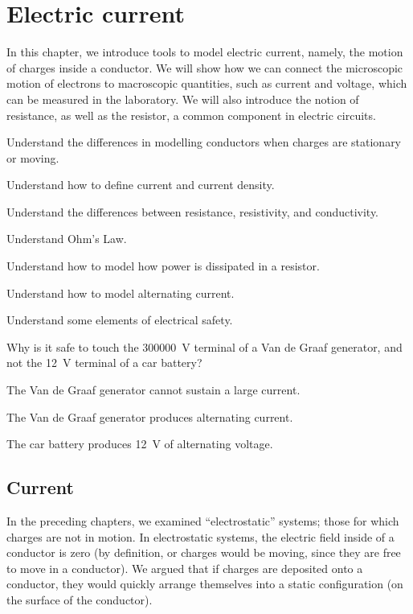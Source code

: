 \chapter{Electric current}
\label{chapter:current}
In this chapter, we introduce tools to model electric current, namely, the motion of charges inside a conductor. We will show how we can connect the microscopic motion of electrons to macroscopic quantities, such as current and voltage, which can be measured in the laboratory. We will also introduce the notion of resistance, as well as the resistor, a common component in electric circuits.
\begin{learningObjectives}{
 \item Understand the differences in modelling conductors when charges are stationary or moving.
 \item Understand how to define current and current density.
 \item Understand the differences between resistance, resistivity, and conductivity.
 \item Understand Ohm's Law.
 \item Understand how to model how power is dissipated in a resistor.
 \item Understand how to model alternating current.
 \item Understand some elements of electrical safety.
 }
\end{learningObjectives}

\begin{opening}
\begin{MCquestion}{Why is it safe to touch the \SI{300000}{V} terminal of a Van de Graaf generator, and not the \SI{12}{V} terminal of a car battery?}
\item The Van de Graaf generator cannot sustain a large current. \correct
\item The Van de Graaf generator produces alternating current.
\item The car battery produces \SI{12}{V} of alternating voltage.
\end{MCquestion}
\end{opening}

\section{Current}
In the preceding chapters, we examined ``electrostatic'' systems; those for which charges are not in motion. In electrostatic systems, the electric field inside of a conductor is zero (by definition, or charges would be moving, since they are free to move in a conductor). We argued that if charges are deposited onto a conductor, they would quickly arrange themselves into a static configuration (on the surface of the conductor).

